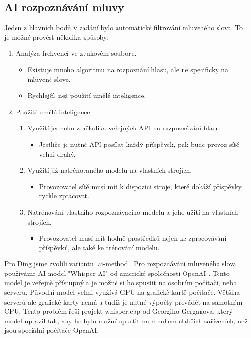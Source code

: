 \subsection{AI rozpoznávání mluvy} \label{backend-ai}

Jeden z hlavních bodů v zadání bylo automatické filtrování mluveného slova. To je možné provést
několika způsoby:

\begin{enumerate}
    \item Analýza frekvencí ve zvukovém souboru.
        \begin{itemize}
            \item Existuje mnoho algoritmu na rozpoznání hlasu, ale ne specificky na mluvené slovo.
            \item Rychlejší, než použití umělé inteligence.
        \end{itemize}
    \item Použití umělé inteligence
        \begin{enumerate}
            \item Využití jednoho z několika veřejných API na rozpoznávání hlasu.
                \begin{itemize}
                    \item Jestliže je nutné API posílat každý příspěvek, pak bude provoz sítě velmi
                        drahý.
                \end{itemize}
            \item Využití již natrénovaného modelu na vlastních strojích. \label{ai-method}
                \begin{itemize}
                    \item Provozovatel sítě musí mít k dispozici stroje, které dokáží příspěvky
                        rychle zpracovat.
                \end{itemize}
            \item Natrénování vlastního rozpoznávacího modelu a jeho užití na vlastních strojích.
                \begin{itemize}
                    \item Provozovatel musí mít hodně prostředků nejen ke zpracovávání příspěvků,
                        ale také ke trénování modelu.
                \end{itemize}
        \end{enumerate}
\end{enumerate}

Pro Ding jsme zvolili variantu \ref{ai-method}. Pro rozpoznávání mluveného slova používáme AI model
"Whisper AI" od americké společnosti OpenAI \cite{openai-whisper}. Tento model je veřejně přístupný
a je možné si ho spustit na osobním počítači, nebo serveru. Původní model velmi využívá GPU na
grafické kartě počítače. Většina serverů ale grafické karty nemá a tudíž je nutné výpočty provádět
na samotném CPU. Tento problém řeší projekt whisper.cpp od Georgiho Gerganova, který model upravil
tak, aby ho bylo možné spustit na mnohem slabších zařízeních, než jsou speciální počítače OpenAI.

